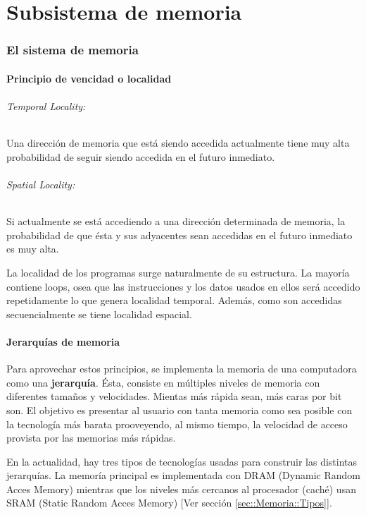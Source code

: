 \part{Subsistema de memoria}
\section{El sistema de memoria}
\subsection{Principio de vencidad o localidad}
\paragraph{Temporal Locality:} Una dirección de memoria que está siendo accedida actualmente tiene muy alta probabilidad de seguir siendo accedida en el futuro inmediato.

\paragraph{Spatial Locality:} Si actualmente se está accediendo a una dirección determinada de memoria, la probabilidad de que ésta y sus adyacentes sean accedidas en el futuro inmediato es muy alta.

La localidad de los programas surge naturalmente de su estructura. La mayoría contiene loops, osea que las instrucciones y los datos usados en ellos será accedido repetidamente lo que genera localidad temporal. Además, como son accedidas secuencialmente se tiene localidad espacial.

\subsection{Jerarquías de memoria}
Para aprovechar estos principios, se implementa la memoria de una computadora como una \textbf{jerarquía}. Ésta, consiste en múltiples niveles de memoria con diferentes tamaños y velocidades. Mientas más rápida sean, más caras por bit son. El objetivo es presentar al usuario con tanta memoria como sea posible con la tecnología más barata prooveyendo, al mismo tiempo, la velocidad de acceso provista por las memorias más rápidas.

En la actualidad, hay tres tipos de tecnologías usadas para construir las distintas jerarquías. La memoría principal es implementada con DRAM (Dynamic Random Acces Memory) mientras que los niveles más cercanos al procesador (caché) usan SRAM (Static Random Acces Memory)  [Ver sección \ref{sec::Memoria::Tipos}].


